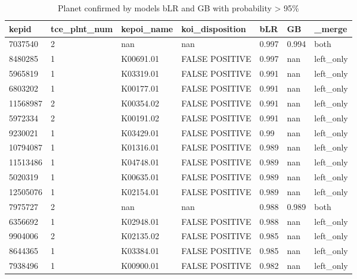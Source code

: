 \begin{table}[!htbp]
 \centering
 \caption{Planet confirmed by models bLR and GB with probability > 95\%}
 \label{databLRGBcreftab} 
  \begin{tabular}
{| 
 p{}| 
 p{}| 
 p{}| 
 p{}| 
 p{}| 
 p{}| 
 p{}| 
}\hline 
\textbf{kepid} &\textbf{tce\_plnt\_num} &\textbf{kepoi\_name} &\textbf{koi\_disposition} &\textbf{bLR} &\textbf{GB} &\textbf{\_merge} \\ \hline 
7037540 &2 &nan &nan &0.997 &0.994 &both \\ \hline 
8480285 &1 &K00691.01 &FALSE POSITIVE &0.997 &nan &left\_only \\ \hline 
5965819 &1 &K03319.01 &FALSE POSITIVE &0.991 &nan &left\_only \\ \hline 
6803202 &1 &K00177.01 &FALSE POSITIVE &0.991 &nan &left\_only \\ \hline 
11568987 &2 &K00354.02 &FALSE POSITIVE &0.991 &nan &left\_only \\ \hline 
5972334 &2 &K00191.02 &FALSE POSITIVE &0.991 &nan &left\_only \\ \hline 
9230021 &1 &K03429.01 &FALSE POSITIVE &0.99 &nan &left\_only \\ \hline 
10794087 &1 &K01316.01 &FALSE POSITIVE &0.989 &nan &left\_only \\ \hline 
11513486 &1 &K04748.01 &FALSE POSITIVE &0.989 &nan &left\_only \\ \hline 
5020319 &1 &K00635.01 &FALSE POSITIVE &0.989 &nan &left\_only \\ \hline 
12505076 &1 &K02154.01 &FALSE POSITIVE &0.989 &nan &left\_only \\ \hline 
7975727 &2 &nan &nan &0.988 &0.989 &both \\ \hline 
6356692 &1 &K02948.01 &FALSE POSITIVE &0.988 &nan &left\_only \\ \hline 
9904006 &2 &K02135.02 &FALSE POSITIVE &0.985 &nan &left\_only \\ \hline 
8644365 &1 &K03384.01 &FALSE POSITIVE &0.985 &nan &left\_only \\ \hline 
7938496 &1 &K00900.01 &FALSE POSITIVE &0.982 &nan &left\_only \\ \hline 

\end{tabular}
\end{table}
